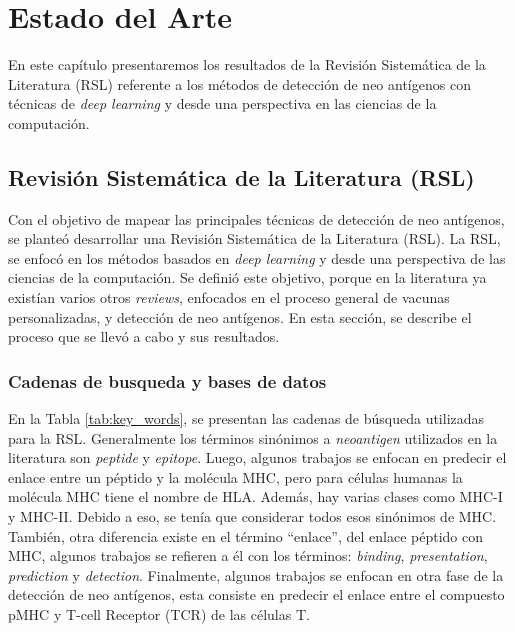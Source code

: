 \chapter{Estado del Arte}
\label{cap:estadodelarte}

En este capítulo presentaremos los resultados de la Revisión Sistemática de la Literatura (RSL) referente a los métodos de detección de neo antígenos con técnicas de \textit{deep learning} y desde una perspectiva en las ciencias de la computación.


\section{Revisión Sistemática de la Literatura (RSL)}

Con el objetivo de mapear las principales técnicas de detección de  neo antígenos, se planteó desarrollar una Revisión Sistemática de la Literatura (RSL). La RSL, se enfocó en los métodos basados en \textit{deep learning} y desde una perspectiva de las ciencias de la computación. Se definió este objetivo, porque en la literatura ya existían varios otros \textit{reviews}, enfocados en el proceso general de vacunas personalizadas, y detección de neo antígenos. En esta sección, se describe el proceso que se llevó a cabo y sus resultados.


\subsection{Cadenas de busqueda y bases de datos}

En la Tabla \ref{tab:key_words}, se presentan las cadenas de búsqueda utilizadas para la RSL. Generalmente los términos sinónimos a \textit{neoantigen} utilizados en la literatura son \textit{peptide} y \textit{epitope}. Luego, algunos trabajos se enfocan en predecir el enlace entre un péptido y la molécula MHC, pero para células humanas la molécula MHC tiene el nombre de HLA. Además, hay varias clases como MHC-I y MHC-II. Debido a eso, se tenía que considerar todos esos sinónimos de MHC. También, otra diferencia existe en el término ``enlace'', del enlace péptido con MHC, algunos trabajos se refieren a él con los términos: \textit{binding}, \textit{presentation}, \textit{prediction} y \textit{detection}. Finalmente, algunos trabajos se enfocan en otra fase de la detección de neo antígenos, esta consiste en predecir el enlace entre el compuesto pMHC y T-cell Receptor (TCR) de las células T.

